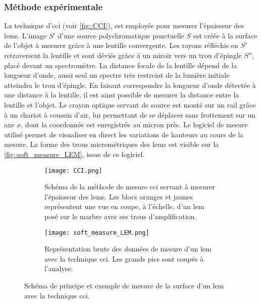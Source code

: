         \subsubsection{Méthode expérimentale}
          La technique d'\acrfull{cci} (voir \autoref{fig::CCI}), est employée pour mesurer l'épaisseur des \glspl{lem}. L'image $S'$ d'une source polychromatique ponctuelle $S$ est créée à la surface de l'objet à mesurer grâce à une lentille convergente. Les rayons réfléchis en $S'$ retraversent la lentille et sont déviés grâce à un miroir vers un trou d'épingle $S''$, placé devant un spectromètre. La distance focale de la lentille dépend de la longueur d'onde, aussi seul un spectre très restreint de la lumière initiale atteindra le trou d'épingle. En faisant correspondre la longueur d'onde détectée à une distance à la lentille, il est ainsi possible de mesurer la distance entre la lentille et l'objet. Le crayon optique servant de source est monté sur un rail grâce à un chariot à coussin d'air, lui permettant de se déplacer sans frottement sur un axe $x$, dont la coordonnée est enregistrée au micron près. Le logiciel de mesure utilisé permet de visualiser en direct les variations de hauteurs au cours de la mesure. La forme des trous micrométriques des \glspl{lem} est visible sur la \autoref{fig::soft_measure_LEM}, issue de ce logiciel. %
          
          \begin{figure}[!htb]
            \begin{subfigure}{0.48\textwidth}
              \texttt{[image: CCI.png]}
              \caption{\label{fig::CCI}Schéma de la méthode de mesure \gls{cci} servant à mesurer l'épaisseur des \glspl{lem}. Les blocs oranges et jaunes représentent une vue en coupe, à l'échelle, d'un \gls{lem} posé sur le marbre avec ses trous d'amplification.}
            \end{subfigure}
            \hfill
            \begin{subfigure}{0.48\textwidth}
              \texttt{[image: soft\_measure\_LEM.png]}
              \caption{\label{fig::soft_measure_LEM}Représentation brute des données de mesure d'un \gls{lem} avec la technique \gls{cci}. Les grands pics sont coupés à l'analyse.}
            \end{subfigure}
            \caption[Schéma de principe et exemple de mesure de la surface d'un LEM avec la technique CCI]{Schéma de principe et exemple de mesure de la surface d'un \gls{lem} avec la technique \gls{cci}.}
          \end{figure}
          
